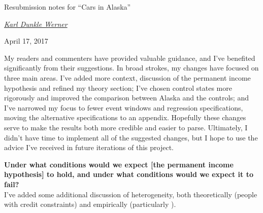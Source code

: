 \documentclass[12pt,letterpaper,oneside]{article}
\begin{document}
\setcounter{page}{0}
\thispagestyle{empty}

\vspace*{0.7in plus 0.3in minus 0.3in}

\begin{center}
    {\huge Resubmission notes for ``Cars in Alaska''}

    \vspace{2em}
    \href{mailto:karldw@berkeley.edu}{\textit{\Large Karl Dunkle Werner}}

    \vspace{1em}
    {\large April 17, 2017}
\end{center}

\vspace{3em plus 1em minus 1em}
\noindent
My readers and commenters have provided valuable guidance, and I've benefited significantly from their suggestions.
In broad strokes, my changes have focused on three main areas.
I've added more context, discussion of the permanent income hypothesis and refined my theory section;
I've chosen control states more rigorously and improved the comparison between Alaska and the controls; and
I've narrowed my focus to fewer event windows and regression specifications, moving the alternative specifications to an appendix.
Hopefully these changes serve to make the results both more credible and easier to parse.
Ultimately, I didn't have time to implement all of the suggested changes, but I hope to use the advice I've received in future iterations of this project.


\pagebreak

\textbf{Under what conditions would we expect [the permanent income hypothesis] to hold, and under what conditions would we expect it to fail?}\\
I've added some additional discussion of heterogeneity, both theoretically (people with credit constraints) and empirically (particularly \cite{misra2014consumption}).
\end{document}
